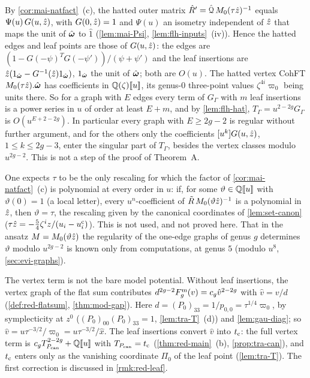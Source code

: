 \begin{rmk}
\label{rmk:mai-apriori}
By \cref{cor:mai-natfact}~(c), the hatted outer matrix $\hat R'=\hat{\mathcal{Q}}\,M_{0}(\tau\hat{z})^{-1}$ equals $\Psi(u)\,G(u,\hat{z})$, with $G(0,\hat{z})=1$ and $\Psi(u)$ an isometry independent of $\hat{z}$ that maps the unit of $\hat{\boldsymbol{\omega}}$ to $\hat1$ (\cref{lem:mai-Psi}, \cref{lem:flh-inputs}~(iv)). Hence the hatted edges and leaf points are those of $G(u,\hat{z})$: the edges are $(1-G(-\psi)^TG(-\psi'))/(\psi+\psi')$ and the leaf insertions are $\hat{z}(1_{\hat{\boldsymbol{\omega}}}-G^{-1}(\hat{z})1_{\hat{\boldsymbol{\omega}}})$, $1_{\hat{\boldsymbol{\omega}}}$ the unit of $\hat{\boldsymbol{\omega}}$; both are $O(u)$. The hatted vertex CohFT $M_{0}(\tau\hat{z}).\hat{\boldsymbol{\omega}}$ has coefficients in $\mathbb{Q}(\zeta)[\![ u ]\!]$, its genus-$0$ three-point values $\zeta^{4i}\varpi_0$ being units there. So for a graph with $E$ edges every term of $G_\Gamma$ with $m$ leaf insertions is a power series in $u$ of order at least $E+m$, and by \cref{lem:flh-hat}, $T_\Gamma=u^{2-2g}G_\Gamma$ is $O(u^{E+2-2g})$. In particular every graph with $E\geq 2g-2$ is regular without further argument, and for the others only the coefficients $[u^k]G(u,\hat{z})$, $1\leq k\leq 2g-3$, enter the singular part of $T_\Gamma$, besides the vertex classes modulo $u^{2g-2}$. This is not a step of the proof of Theorem~A.
\end{rmk}

\begin{rmk}
\label{rmk:mai-tau}
One expects $\tau$ to be the only rescaling for which the factor of \cref{cor:mai-natfact}~(c) is polynomial at every order in $u$: if, for some $\vartheta\in\mathbb{Q}[\![ u ]\!]$ with $\vartheta(0)=1$ (a local letter), every $u^n$-coefficient of $\tilde R\,M_{0}(\vartheta\hat{z})^{-1}$ is a polynomial in $\hat{z}$, then $\vartheta=\tau$, the rescaling given by the canonical coordinates of \cref{lem:set-canon} ($\tau\hat{z}=-\frac54\zeta^iz/(u_i-u_i^{\mathrm c})$). This is not used, and not proved here.
That in the ansatz $M=M_{0}(\vartheta\hat{z})$ the regularity of the one-edge graphs of genus $g$ determines $\vartheta$ modulo $u^{2g-2}$ is known only from computations, at genus $5$ (modulo $u^8$, \cref{sec:evi-graphs}).
\end{rmk}

\begin{rmk}
\label{rmk:mai-vertexterm}
The vertex term is not the bare model potential. Without leaf insertions, the vertex graph of the flat sum contributes $d^{2g-2}F^{\mathrm{m}}_g(v)=c_g\hat v^{2-2g}$ with $\hat v=v/d$ (\cref{def:red-flatsum}, \cref{thm:mod-gap}). Here $d=(P_0)_{33}=1/p_{0,0}=\tau^{1/4}\varpi_0$, by symplecticity at $z^0$ ($(P_0)_{00}(P_0)_{33}=1$, \cref{lem:tra-T}~(d)) and \cref{lem:gau-diag}; so $\hat v=u\tau^{-3/2}/\varpi_0=u\tau^{-3/2}/\hat x$. The leaf insertions convert $\hat v$ into $t_{\mathrm{c}}$: the full vertex term is $c_gT_{P_{\mathrm{can}}}^{2-2g}+\mathbb{Q}[\![ u ]\!]$ with $T_{P_{\mathrm{can}}}=t_{\mathrm{c}}$ (\cref{thm:red-main}~(b), \cref{prop:tra-can}), and $t_{\mathrm{c}}$ enters only as the vanishing coordinate $\Pi_0$ of the leaf point (\cref{lem:tra-T}). The first correction is discussed in \cref{rmk:red-leaf}.
\end{rmk}


